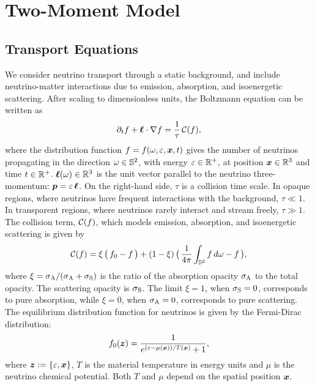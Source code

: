 \section{Two-Moment Model}\label{se:Two-MomentModel}

\subsection{Transport Equations}
We consider neutrino transport through a static background, and include neutrino-matter interactions due to emission, absorption, and isoenergetic scattering.
After scaling to dimensionless units, the Boltzmann equation can be written as
\begin{equation}
  \pd{f}{t}+\vect{\ell}\cdot\nabla f
  =\f{1}{\tau}\,\cC(f),
  \label{eq:boltzmann}
\end{equation}
where the distribution function $f = f(\omega,\varepsilon,\boldsymbol{x},t)$ gives the number of neutrinos propagating in the direction $\omega\in\mathbb{S}^{2}$, with energy $\varepsilon\in\mathbb{R}^{+}$, at position $\boldsymbol{x}\in\mathbb{R}^{3}$ and time $t\in\mathbb{R}^{+}$.  
$\boldsymbol{\ell}(\omega)\in\mathbb{R}^{3}$ is the unit vector parallel to the neutrino three-momentum: $\boldsymbol{p}=\varepsilon\,\boldsymbol{\ell}$.
On the right-hand side, $\tau$ is a collision time scale.  
In opaque regions, where neutrinos have frequent interactions with the background, $\tau\ll1$.  
In transparent regions, where neutrinos rarely interact and stream freely, $\tau\gg1$.
The collision term, $\mathcal{C}(f)$, which models emission, absorption, and isoenergetic scattering is given by
\begin{equation}
  \cC(f)=\xi\,\big(\,f_{0}-f\,\big)
  +(1-\xi)\,\big(\,\f{1}{4\pi}\int_{\bbS^{2}}f\,d\omega-f\,\big),
  \label{eq:collisionTerm}
\end{equation}
where $\xi = \sigma_{{\rm A}} / (\sigma_{{\rm A}}  + \sigma_{{\rm S}} )$ is the ratio of the absorption opacity $\sigma_{{\rm A}}$ to the total opacity.  
The scattering opacity is $\sigma_{{\rm S}}$.  
The limit $\xi = 1$, when $\sigma_{{\rm S}} = 0$, corresponds to pure absorption, while $\xi = 0$, when $\sigma_{{\rm A}} = 0$, corresponds to pure scattering.  
The equilibrium distribution function for neutrinos is given by the Fermi-Dirac distribution:
\begin{equation}
  f_{0}(\vect{z})=\f{1}{e^{(\varepsilon-\mu(\vect{x}))/T(\vect{x})}+1}, 
  \label{eq:fermiDirac}
\end{equation}
where $\boldsymbol{z}:=\{\varepsilon,\boldsymbol{x}\}$, $T$ is the material temperature in energy units and $\mu$ is the neutrino chemical potential.
Both $T$ and $\mu$ depend on the spatial position $\boldsymbol{x}$.

